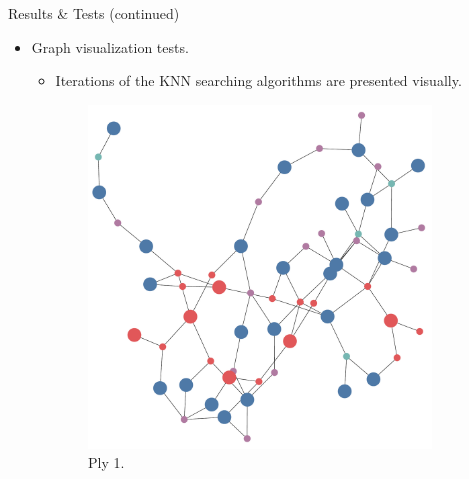 \documentclass[final]{beamer} %
\begin{document}
\begin{frame}
\begin{columns}
\begin{column}{.3\textwidth}
{\begin{block}{Results \& Tests (continued)}
					\begin{itemize}
						\item Graph visualization tests.
						\begin{itemize}
							\item Iterations of the KNN searching algorithms are presented visually.
						\end{itemize}
					\end{itemize}
					
					\begin{figure}[!htb]
						\centering
						\begin{subfigure}[!htb]{0.24\columnwidth}
							\centering
							\includegraphics[width=\columnwidth]{figures/knn_forward_think_1.pdf}
							\caption{Ply 1.}
						\end{subfigure}
						\begin{subfigure}[!htb]{0.24\columnwidth}
							\centering

\end{subfigure}
\end{figure}
\end{block}}
\end{column}
\end{columns}
\end{frame}
\end{document}
